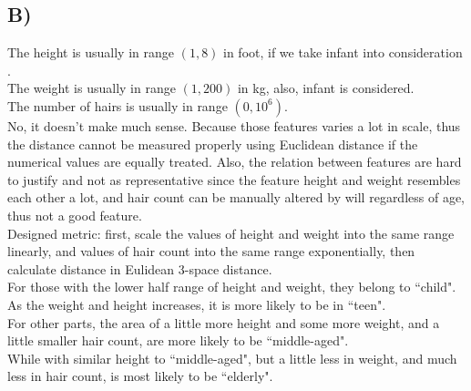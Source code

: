 \documentclass[11pt]{article}
\begin{document}
\subsection*{B)}

The height is usually in range $(1,8)$ in foot, if we take infant into consideration .\\
The weight is usually in range $(1, 200)$ in kg, also, infant is considered.\\
The number of hairs is usually in range $(0, 10^6)$.\\

\noindent No, it doesn't make much sense. Because those features varies a lot in scale, thus the distance cannot be measured properly using Euclidean distance if the numerical values are equally treated. Also, the relation between features are hard to justify and not as representative since the feature height and weight resembles each other a lot, and hair count can be manually altered by will regardless of age, thus not a good feature.\\

\noindent Designed metric: first, scale the values of height and weight into the same range linearly, and values of hair count into the same range exponentially, then calculate distance in Eulidean 3-space distance. \\
For those with the lower half range of height and weight, they belong to ``child".
\\As the weight and height increases, it is more likely to be in ``teen". 
\\For other parts, the area of a little more height and some more weight, and a little smaller hair count, are more likely to be ``middle-aged".
\\While with similar height to ``middle-aged", but a little less in weight, and much less in hair count, is most likely to be ``elderly".
\end{document}

